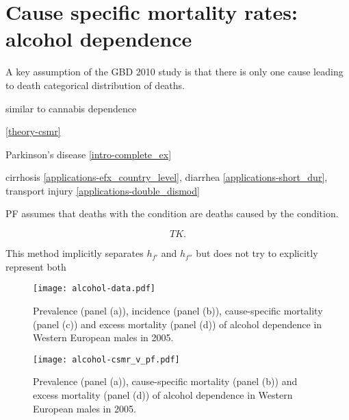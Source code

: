 \chapter{Cause specific mortality rates: alcohol dependence}
\label{applications-csmr}

A key assumption of the GBD 2010 study is that there is only one cause leading to death categorical distribution of deaths.

similar to cannabis dependence \pageref{tab:app-substance_dependence}



\ref{theory-csmr}

Parkinson's disease \ref{intro-complete_ex}

cirrhosis \ref{applications-efx_country_level}, diarrhea \ref{applications-short_dur}, transport injury \ref{applications-double_dismod}

PF assumes that deaths with the condition are deaths caused by the condition.

\begin{equation}
TK.    
\end{equation}

This method implicitly separates $h_{f'}$ and $h_{f''}$ but does not try to explicitly represent both

    \begin{figure}[h]
        \begin{center}
            \texttt{[image: alcohol-data.pdf]}
            \caption{Prevalence (panel (a)), incidence (panel (b)), cause-specific mortality (panel (c)) and excess mortality (panel (d)) of alcohol dependence in Western European males in 2005.}
            \label{fig:app-alcohol data}
        \end{center}
    \end{figure} 
    
    \begin{figure}[h]
        \begin{center}
            \texttt{[image: alcohol-csmr\_v\_pf.pdf]}
            \caption{Prevalence (panel (a)), cause-specific mortality (panel (b)) and excess mortality (panel (d)) of alcohol dependence in Western European males in 2005.}
            \label{fig:app-alcohol compare}
        \end{center}
    \end{figure} 
